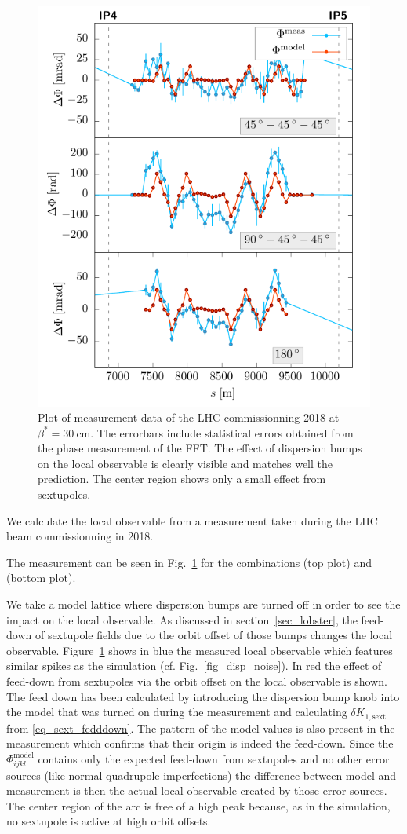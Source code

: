 \begin{figure}[t]
  \centering
  \includegraphics[width=.6\linewidth]{meas}
  \caption{Plot of measurement data of the LHC commissionning 2018 at $\beta^*=\SI{30}{\centi\metre}$.
    The errorbars include statistical errors
    obtained from the phase measurement of the FFT.
    The effect of dispersion bumps on the local observable is clearly visible and matches well the
    prediction. The center region shows only a small effect from sextupoles.
  }
  \label{fig_measlobster002}
\end{figure}
%
We calculate the local observable from a measurement taken during the LHC beam commissionning in 2018.

The measurement can be seen in Fig.~\ref{fig_measlobster002} for the combinations 
(top plot) and  (bottom plot).

We take a model lattice where dispersion bumps are turned off in order to see the impact on the 
local observable.
As discussed in section~\ref{sec_lobster}, the feed-down of sextupole fields due to the orbit offset
of those bumps changes the local observable.
Figure~\ref{fig_measlobster002} shows in blue the measured local observable which features similar
spikes as the simulation (cf. Fig.~\ref{fig_disp_noise}).
In red the effect of feed-down from sextupoles via the orbit offset on the local observable is shown.
The feed down has been calculated by introducing the dispersion bump knob into the model that was turned
on during the measurement and calculating $\delta K_{1, \text{sext}}$ from \eqref{eq_sext_fedddown}.
The pattern of the model
values is also present in the measurement which confirms that their origin is indeed the feed-down.
Since the $\Phi_{ijkl}^\text{model}$ contains only the expected feed-down from sextupoles and no other
error sources (like normal quadrupole imperfections) the difference between model and measurement is
then the actual local observable created by those error sources.
The center region of the arc is free of a high peak because, as in the simulation, no sextupole is 
active at high orbit offsets.
